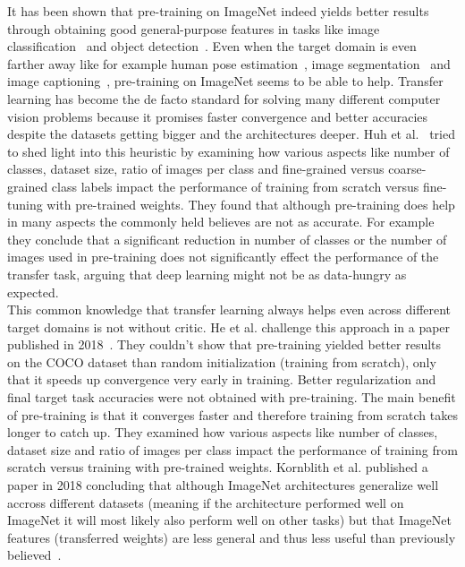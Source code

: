 It has been shown that pre-training on ImageNet indeed yields better results through obtaining good general-purpose features in tasks like image classification~\cite{sharif2014cnn} and object detection~\cite{girshick2014rich, sermanet2013overfeat}. Even when the target domain is even farther away like for example human pose estimation~\cite{carreira2016human}, image segmentation~\cite{dai2016instance} and image captioning~\cite{donahue2015long, karpathy2015deep}, pre-training on ImageNet seems to be able to help. Transfer learning has become the de facto standard for solving many different computer vision problems because it promises faster convergence and better accuracies despite the datasets getting bigger and the architectures deeper. Huh et al.~\cite{huh2016makes} tried to shed light into this heuristic by examining how various aspects like number of classes, dataset size, ratio of  images per class and fine-grained versus coarse-grained class labels impact the performance of training from scratch versus fine-tuning with pre-trained weights. They found that although pre-training does help in many aspects the commonly held believes are not as accurate. For example they conclude that a significant reduction in number of classes or the number of images used in pre-training does not significantly effect the performance of the transfer task, arguing that deep learning might not be as data-hungry as expected.\\


This common knowledge that transfer learning always helps even across different target domains is not without critic. He et al. challenge this approach in a paper published in 2018~\cite{he2018rethinking}. They couldn't show that pre-training yielded better results on the COCO dataset than random initialization (training from scratch), only that it speeds up convergence very early in training. Better regularization and final target task accuracies were not obtained with pre-training. The main benefit of pre-training is that it converges faster and therefore training from scratch takes longer to catch up. They examined how various aspects like number of classes, dataset size and ratio of images per class impact the performance of training from scratch versus training with pre-trained weights.
Kornblith et al. published a paper in 2018 concluding that although ImageNet architectures generalize well accross different datasets (meaning if the architecture performed well on ImageNet it will most likely also perform well on other tasks) but that ImageNet features (transferred weights) are less general and thus less useful than previously believed~\cite{kornblith2018better}.\\

